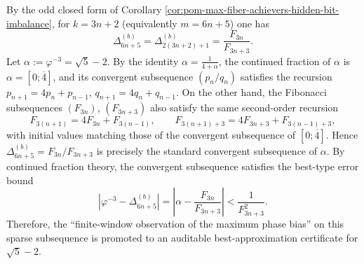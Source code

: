 \begin{remark}\label{rem:pom-max-fiber-bias-amplitude-cf-acceleration}
By the odd closed form of Corollary \ref{cor:pom-max-fiber-achievers-hidden-bit-imbalance},
for \(k=3n+2\) (equivalently \(m=6n+5\)) one has
\[
\Delta_{6n+5}^{(b)}=\Delta_{2(3n+2)+1}^{(b)}=\frac{F_{3n}}{F_{3n+3}}.
\]
Let \(\alpha:=\varphi^{-3}=\sqrt5-2\).
By the identity \(\alpha=\frac{1}{4+\alpha}\), the continued fraction of \(\alpha\) is \(\alpha=[0;\overline{4}]\), and its convergent subsequence \((p_n/q_n)\) satisfies the recursion
\(
p_{n+1}=4p_n+p_{n-1}
\), \(
q_{n+1}=4q_n+q_{n-1}
\).
On the other hand, the Fibonacci subsequences \((F_{3n})\), \((F_{3n+3})\) also satisfy the same second-order recursion
\[
F_{3(n+1)}=4F_{3n}+F_{3(n-1)},\qquad
F_{3(n+1)+3}=4F_{3n+3}+F_{3(n-1)+3},
\]
with initial values matching those of the convergent subsequence of \([0;\overline{4}]\). Hence \(\Delta_{6n+5}^{(b)}=F_{3n}/F_{3n+3}\) is precisely the standard convergent subsequence of \(\alpha\).
By continued fraction theory, the convergent subsequence satisfies the best-type error bound
\[
\boxed{\;
\left|\varphi^{-3}-\Delta_{6n+5}^{(b)}\right|
=\left|\alpha-\frac{F_{3n}}{F_{3n+3}}\right|
<\frac{1}{F_{3n+3}^2}.\;}
\]
Therefore, the ``finite-window observation of the maximum phase bias'' on this sparse subsequence is promoted to an auditable best-approximation certificate for \(\sqrt5-2\).
\end{remark}

\endinput
